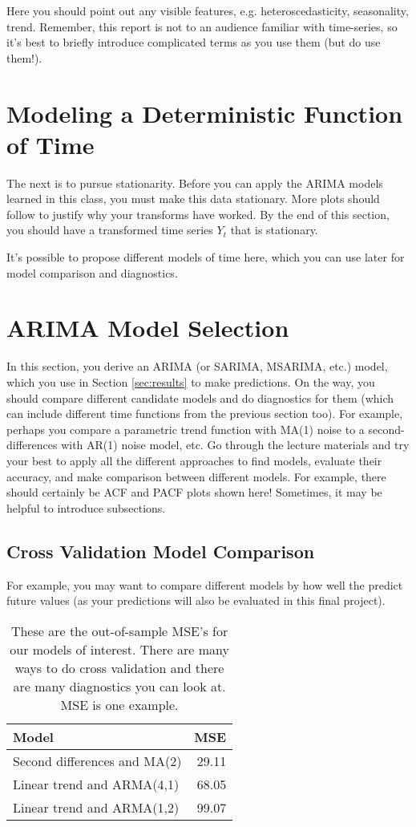 \documentclass[a4paper]{article}
\begin{document}
Here you should point out any visible features, e.g. heteroscedasticity, seasonality, trend. Remember, this report is not to an audience familiar with time-series, so it's best to briefly introduce complicated terms as you use them (but do use them!).  

\section{Modeling a Deterministic Function of Time}

The next is to pursue stationarity. Before you can apply the ARIMA models learned in this class, you must make this data stationary. More plots should follow to justify why your transforms have worked. By the end of this section, you should have a transformed time series $Y_t$ that is stationary. 

It's possible to propose different models of time here, which you can use later for model comparison and diagnostics. 

\section{ARIMA Model Selection}
\label{sec:arima_model}
In this section, you derive an ARIMA (or SARIMA, MSARIMA, etc.) model, which you use in Section \ref{sec:results} to make predictions. 
%
On the way, you should compare different candidate models and do diagnostics for them (which can include different time functions from the previous section too). For example, perhaps you compare a parametric trend function with MA(1) noise to a second-differences with AR(1) noise model, etc.  
%
Go through the lecture materials and try your best to apply all the different approaches to find models, evaluate their accuracy, and make comparison between different models.
%
For example, there should certainly be ACF and PACF plots shown here!
%
Sometimes, it may be helpful to introduce subsections.

\subsection{Cross Validation Model Comparison}
For example, you may want to compare different models by how well the predict future values (as your predictions will also be evaluated in this final project).


	
	\begin{table}[h!]
	\centering
\begin{tabular}{lr}
	  Model & MSE \\ \hline
	  Second differences and MA(2) & 29.11 \\
	  Linear trend and ARMA(4,1) & 68.05 \\
		Linear trend and ARMA(1,2) & 99.07
	\end{tabular}
	\caption{These are the out-of-sample MSE's for our models of interest. There are many ways to do cross validation and there are many diagnostics you can look at. MSE is one example.}
	\label{tab:param_est}
\end{table}
\end{document}

